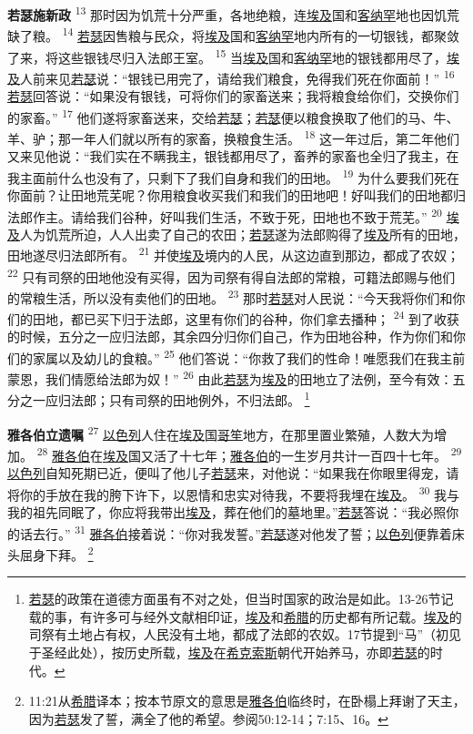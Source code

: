 \textbf{若瑟施新政\quad}
\textsuperscript{13}
那时因为饥荒十分严重，各地绝粮，连\uline{埃及}国和\uline{客纳罕}地也因饥荒缺了粮。
\textsuperscript{14}
\uline{若瑟}因售粮与民众，将\uline{埃及}国和\uline{客纳罕}地内所有的一切银钱，都聚敛了来，将这些银钱尽归入法郎王室。
\textsuperscript{15}
当\uline{埃及}国和\uline{客纳罕}地的银钱都用尽了，\uline{埃及}人前来见\uline{若瑟}说：“银钱已用完了，请给我们粮食，免得我们死在你面前！”
\textsuperscript{16}
\uline{若瑟}回答说：“如果没有银钱，可将你们的家畜送来；我将粮食给你们，交换你们的家畜。”
\textsuperscript{17}
他们遂将家畜送来，交给\uline{若瑟}；\uline{若瑟}便以粮食换取了他们的马、牛、羊、驴；那一年人们就以所有的家畜，换粮食生活。
\textsuperscript{18}
这一年过后，第二年他们又来见他说：“我们实在不瞒我主，银钱都用尽了，畜养的家畜也全归了我主，在我主面前什么也没有了，只剩下了我们自身和我们的田地。
\textsuperscript{19}
为什么要我们死在你面前？让田地荒芜呢？你用粮食收买我们和我们的田地吧！好叫我们的田地都归法郎作主。请给我们谷种，好叫我们生活，不致于死，田地也不致于荒芜。”
\textsuperscript{20}
\uline{埃及}人为饥荒所迫，人人出卖了自己的农田；\uline{若瑟}遂为法郎购得了\uline{埃及}所有的田地，田地遂尽归法郎所有。
\textsuperscript{21}
并使\uline{埃及}境内的人民，从这边直到那边，都成了农奴；
\textsuperscript{22}
只有司祭的田地他没有买得，因为司祭有得自法郎的常粮，可籍法郎赐与他们的常粮生活，所以没有卖他们的田地。
\textsuperscript{23}
那时\uline{若瑟}对人民说：“今天我将你们和你们的田地，都已买下归于法郎，这里有你们的谷种，你们拿去播种；
\textsuperscript{24}
到了收获的时候，五分之一应归法郎，其余四分归你们自己，作为田地谷种，作为你们和你们的家属以及幼儿的食粮。”
\textsuperscript{25}
他们答说：“你救了我们的性命！唯愿我们在我主前蒙恩，我们情愿给法郎为奴！”
\textsuperscript{26}
由此\uline{若瑟}为\uline{埃及}的田地立了法例，至今有效：五分之一应归法郎；只有司祭的田地例外，不归法郎。
\footnote{\uline{若瑟}的政策在道德方面虽有不对之处，但当时国家的政治是如此。13-26节记载的事，有许多可与经外文献相印证，\uline{埃及}和\uline{希腊}的历史都有所记载。\uline{埃及}的司祭有土地占有权，人民没有土地，都成了法郎的农奴。17节提到“马”（初见于圣经此处），按历史所载，\uline{埃及}在\uline{希克}\uline{索斯}朝代开始养马，亦即\uline{若瑟}的时代。}

\textbf{雅各伯立遗嘱\quad}
\textsuperscript{27}
\uline{以色列}人住在\uline{埃及}国\uline{哥笙}地方，在那里置业繁殖，人数大为增加。
\textsuperscript{28}
\uline{雅各伯}在\uline{埃及}国又活了十七年；\uline{雅各伯}的一生岁月共计一百四十七年。
\textsuperscript{29}
\uline{以色列}自知死期已近，便叫了他儿子\uline{若瑟}来，对他说：“如果我在你眼里得宠，请将你的手放在我的胯下许下，以恩情和忠实对待我，不要将我埋在\uline{埃及}。
\textsuperscript{30}
我与我的祖先同眠了，你应将我带出\uline{埃及}，葬在他们的墓地里。”\uline{若瑟}答说：“我必照你的话去行。”
\textsuperscript{31}
\uline{雅各伯}接着说：“你对我发誓。”\uline{若瑟}遂对他发了誓；\uline{以色列}便靠着床头屈身下拜。
\footnote{11:21从\uline{希腊}译本；按本节原文的意思是\uline{雅各伯}临终时，在卧榻上拜谢了天主，因为\uline{若瑟}发了誓，满全了他的希望。参阅50:12-14；7:15、16。}

